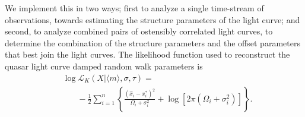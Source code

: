 \documentclass{emulateapj}
\begin{document}
We implement this in two ways; first to analyze a single time-stream
of observations, towards estimating the structure parameters of the
light curve; and second, to analyze combined pairs of ostensibly
correlated light curves, to determine the combination of the structure
parameters and the offset parameters that best join the light
curves. The likelihood function used to reconstruct the quasar light
curve damped random walk parameters is
\begin{align} 
& \log\mathcal{L}_{K}(X | \langle m\rangle, \sigma,\tau) =\nonumber \\
& \ \ \ \ \ \ \ \ -\frac{1}{2}\sum_{i=1}^{n}\left\{
\frac{\left(\hat{x}_i-x^{*}_i\right)^2}{\Omega_i+\sigma_i^2} 
+ 
\log\left[2\pi\left(\Omega_i+\sigma_i^2\right)\right]
\right\}. 
\end{align}
\end{document}
